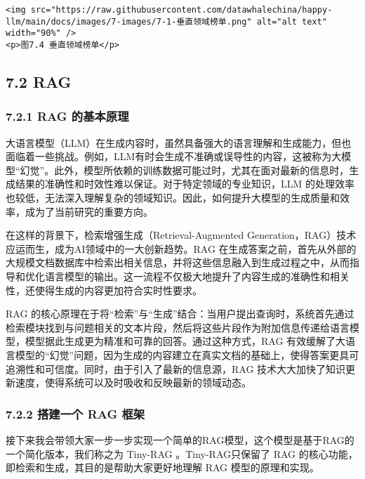 \documentclass[
]{article}
\begin{document}
\begin{verbatim}
<img src="https://raw.githubusercontent.com/datawhalechina/happy-llm/main/docs/images/7-images/7-1-垂直领域榜单.png" alt="alt text" width="90%" />
<p>图7.4 垂直领域榜单</p>
\end{verbatim}

\subsection{7.2 RAG}\label{rag}

\subsubsection{7.2.1 RAG
的基本原理}\label{rag-ux7684ux57faux672cux539fux7406}

大语言模型（LLM）在生成内容时，虽然具备强大的语言理解和生成能力，但也面临着一些挑战。例如，LLM有时会生成不准确或误导性的内容，这被称为大模型``幻觉''。此外，模型所依赖的训练数据可能过时，尤其在面对最新的信息时，生成结果的准确性和时效性难以保证。对于特定领域的专业知识，LLM
的处理效率也较低，无法深入理解复杂的领域知识。因此，如何提升大模型的生成质量和效率，成为了当前研究的重要方向。

在这样的背景下，检索增强生成（Retrieval-Augmented
Generation，RAG）技术应运而生，成为AI领域中的一大创新趋势。RAG
在生成答案之前，首先从外部的大规模文档数据库中检索出相关信息，并将这些信息融入到生成过程之中，从而指导和优化语言模型的输出。这一流程不仅极大地提升了内容生成的准确性和相关性，还使得生成的内容更加符合实时性要求。

RAG
的核心原理在于将``检索''与``生成''结合：当用户提出查询时，系统首先通过检索模块找到与问题相关的文本片段，然后将这些片段作为附加信息传递给语言模型，模型据此生成更为精准和可靠的回答。通过这种方式，RAG
有效缓解了大语言模型的``幻觉''问题，因为生成的内容建立在真实文档的基础上，使得答案更具可追溯性和可信度。同时，由于引入了最新的信息源，RAG
技术大大加快了知识更新速度，使得系统可以及时吸收和反映最新的领域动态。

\subsubsection{7.2.2 搭建一个 RAG
框架}\label{ux642dux5efaux4e00ux4e2a-rag-ux6846ux67b6}

接下来我会带领大家一步一步实现一个简单的RAG模型，这个模型是基于RAG的一个简化版本，我们称之为
Tiny-RAG 。Tiny-RAG只保留了 RAG
的核心功能，即检索和生成，其目的是帮助大家更好地理解 RAG
模型的原理和实现。
\end{document}
